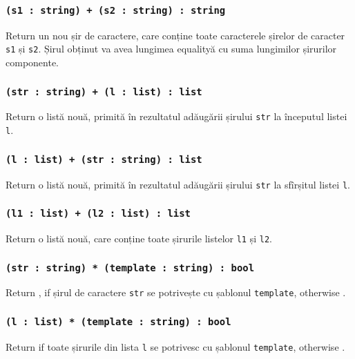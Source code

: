 \subsubsection{\texttt{(s1 : string) + (s2 : string) : string}}

Return un nou șir de caractere, care conține toate caracterele șirelor de caracter \texttt{s1} și \texttt{s2}. Șirul obținut va avea lungimea equalityă cu suma lungimilor șirurilor componente.

\subsubsection{\texttt{(str : string) + (l : list) : list}}

Return o listă nouă, primită în rezultatul adăugării șirului \texttt{str} la începutul listei \texttt{l}.

\subsubsection{\texttt{(l : list) + (str : string) : list}}

Return o listă nouă, primită în rezultatul adăugării șirului \texttt{str} la sfîrșitul listei \texttt{l}.

\subsubsection{\texttt{(l1 : list) + (l2 : list) : list}}

Return o listă nouă, care conține toate șirurile listelor \texttt{l1} și \texttt{l2}.

\subsubsection{\texttt{(str : string) * (template : string) : bool}}

Return \true{}, if șirul de caractere \texttt{str} se potrivește cu șablonul \texttt{template}, otherwise \false{}.

\subsubsection{\texttt{(l : list) * (template : string) : bool}}

Return \true{} if toate șirurile din lista \texttt{l} se potrivesc cu șablonul \texttt{template}, otherwise \false{}.

